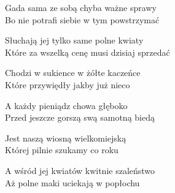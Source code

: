 \begin{text}
    Gada sama ze sobą chyba ważne sprawy\\
    Bo nie potrafi siebie w tym powstrzymać

    Słuchają jej tylko same polne kwiaty\\
    Które za wszelką cenę musi dzisiaj sprzedać

    Chodzi w sukience w żółte kaczeńce\\
    Które przywiędły jakby już nieco

    A każdy pieniądz chowa głęboko\\
    Przed jeszcze gorszą swą samotną biedą

    Jest naszą wiosną  wielkomiejską\\
    Której pilnie szukamy co roku

    A wśród jej kwiatów kwitnie szaleństwo\\
    Aż polne maki  uciekają w popłochu

\end{text}
\begin{chord}

\end{chord}